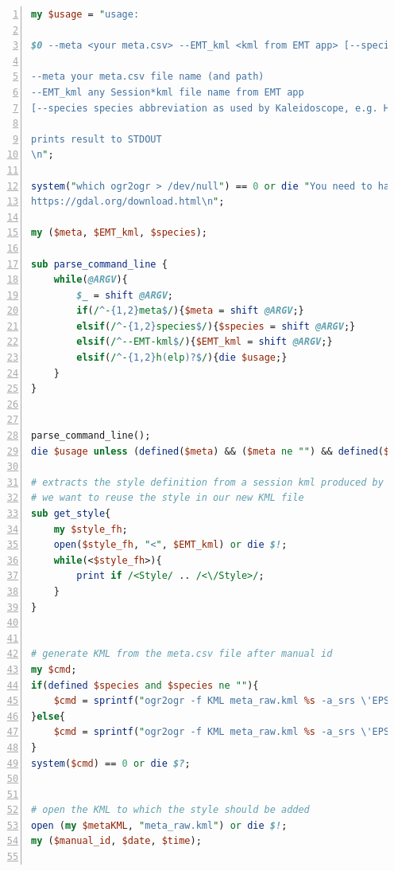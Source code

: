 \documentclass[English, 11pt, twoside, authoryear]{article}
\begin{document}
\begin{lstlisting}[language=Perl, backgroundcolor = \color{OliveGreen}, basicstyle=\small\ttfamily\color{white}, keywordstyle=\color{YellowOrange}\bfseries,
identifierstyle=\color{Cyan}\bfseries, stringstyle=\color{BrickRed}, commentstyle=\color{blue}, title=\texttt{style2kml.pl}, numbers=left, numberstyle=\color{black}]
my $usage = "usage: 

$0 --meta <your meta.csv> --EMT_kml <kml from EMT app> [--species <species abbreviation>]

--meta your meta.csv file name (and path)
--EMT_kml any Session*kml file name from EMT app 
[--species species abbreviation as used by Kaleidoscope, e.g. HYPSAV]

prints result to STDOUT
\n";

system("which ogr2ogr > /dev/null") == 0 or die "You need to have the utility ogr2ogr installed and in your PATH.
https://gdal.org/download.html\n";

my ($meta, $EMT_kml, $species);

sub parse_command_line {
    while(@ARGV){
        $_ = shift @ARGV;
        if(/^-{1,2}meta$/){$meta = shift @ARGV;}
        elsif(/^-{1,2}species$/){$species = shift @ARGV;}
        elsif(/^--EMT-kml$/){$EMT_kml = shift @ARGV;}
        elsif(/^-{1,2}h(elp)?$/){die $usage;}
    }
}


parse_command_line();
die $usage unless (defined($meta) && ($meta ne "") && defined($EMT_kml) && ($EMT_kml ne ""));

# extracts the style definition from a session kml produced by EMT app
# we want to reuse the style in our new KML file
sub get_style{
    my $style_fh;
    open($style_fh, "<", $EMT_kml) or die $!; 
    while(<$style_fh>){
        print if /<Style/ .. /<\/Style>/;
    }   
}


# generate KML from the meta.csv file after manual id
my $cmd;
if(defined $species and $species ne ""){
    $cmd = sprintf("ogr2ogr -f KML meta_raw.kml %s -a_srs \'EPSG:4326\' -oo X_POSSIBLE_NAMES=LON\* -oo Y_POSSIBLE_NAMES=LAT\* -oo KEEP_GEOM_COLUMNS=NO -where  \"\\\"MANUAL ID\\\" LIKE \'%%%s%%\'\" ", $meta, $species);
}else{
    $cmd = sprintf("ogr2ogr -f KML meta_raw.kml %s -a_srs \'EPSG:4326\' -oo X_POSSIBLE_NAMES=LON\* -oo Y_POSSIBLE_NAMES=LAT\* -oo KEEP_GEOM_COLUMNS=NO", $meta);
}
system($cmd) == 0 or die $?;


# open the KML to which the style should be added
open (my $metaKML, "meta_raw.kml") or die $!;
my ($manual_id, $date, $time);


\end{lstlisting}
\end{document}
